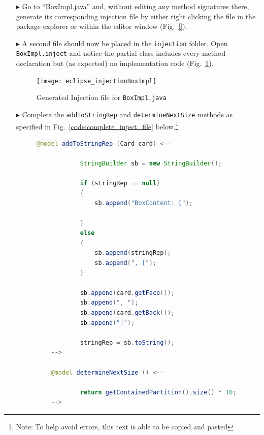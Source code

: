 \begin{itemize}

\item[$\blacktriangleright$] Go to ``BoxImpl.java'' and, without editing any method signatures there, generate its corresponding injection file by either right
clicking the file in the package explorer or within the editor window (Fig.~\ref{}).

\item[$\blacktriangleright$] A second file should now be placed in the \texttt{injection} folder. Open \texttt{BoxImpl.inject} and notice the
partial class includes every method declaration but (as expected) no implementation code (Fig.~\ref{fig:injection_partialClassBox}).

\begin{figure}[htbp]
    \centering
    \texttt{[image: eclipse\_injectionBoxImpl]}
    \caption{Generated Injection file for \texttt{BoxImpl.java}}
    \label{fig:injection_partialClassBox}
\end{figure}

\item[$\blacktriangleright$] Complete the \texttt{addToStringRep} and \texttt{determineNextSize} methods as specified in Fig.~\ref{code:complete_inject_file}
below.\footnote{Note: To help avoid errors, this text is able to be copied and pasted}

\vspace{0.5cm}

\begin{figure}[htbp]
        \centering
        \begin{lstlisting}[language=Java, keywordstyle={\bfseries\color{purple}}, backgroundcolor=\color{white}]
    @model addToStringRep (Card card) <--

            StringBuilder sb = new StringBuilder();

            if (stringRep == null)
            {
                sb.append("BoxContent: [");

            }
            else
            {
                sb.append(stringRep);
                sb.append(", [");
            }

            sb.append(card.getFace());
            sb.append(", ");
            sb.append(card.getBack());
            sb.append("]");

            stringRep = sb.toString();
    -->

    @model determineNextSize () <--

            return getContainedPartition().size() * 10;
    -->


\end{lstlisting}
\end{figure}
\end{itemize}
